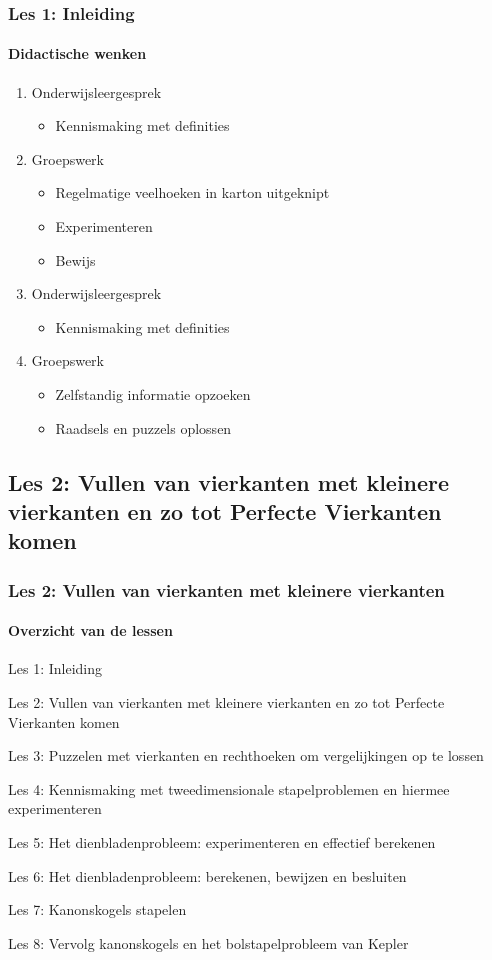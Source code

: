 \documentclass[dutch]{beamer}
\begin{document}
\begin{frame}
\frametitle{Les 1: Inleiding}
\framesubtitle{Didactische wenken}
\begin{enumerate}
	\item Onderwijsleergesprek
	\begin{itemize}
	\item Kennismaking met definities
	\end{itemize}
	\item Groepswerk
	\begin{itemize}
	\item Regelmatige veelhoeken in karton uitgeknipt
	\item Experimenteren
	\item Bewijs
	\end{itemize}
  \item Onderwijsleergesprek
  \begin{itemize}
	\item Kennismaking met definities
	\end{itemize}
	\item Groepswerk
	\begin{itemize}
	\item Zelfstandig informatie opzoeken
	\item Raadsels en puzzels oplossen
	\end{itemize}
\end{enumerate}
\end{frame}

\subsection{Les 2: Vullen van vierkanten met kleinere vierkanten en zo tot Perfecte Vierkanten komen}
\begin{frame}
\frametitle{Les 2: Vullen van vierkanten met kleinere vierkanten}
\framesubtitle{Overzicht van de lessen}
\begin{list}{\quad}{}
\item Les 1: Inleiding
\item {\color{blue}Les 2: Vullen van vierkanten met kleinere vierkanten en zo tot Perfecte Vierkanten komen}
\item Les 3: Puzzelen met vierkanten en rechthoeken om vergelijkingen op te lossen
\item Les 4: Kennismaking met tweedimensionale stapelproblemen en hiermee experimenteren
\item Les 5: Het dienbladenprobleem: experimenteren en effectief berekenen
\item Les 6: Het dienbladenprobleem: berekenen, bewijzen en besluiten
\item Les 7: Kanonskogels stapelen
\item Les 8: Vervolg kanonskogels en het bolstapelprobleem van Kepler
\end{list}
\end{frame}
\end{document}
